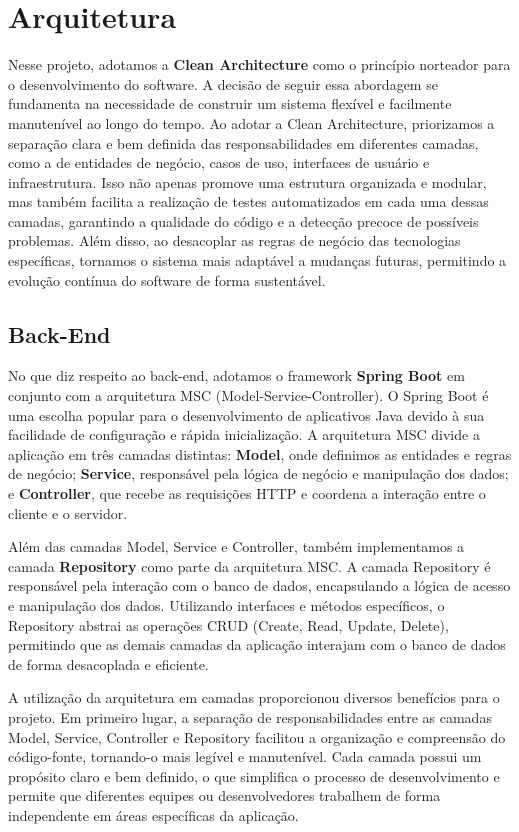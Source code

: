 \section{Arquitetura}

Nesse projeto, adotamos a \textbf{Clean Architecture} como o princípio norteador para o desenvolvimento do software. A decisão de seguir essa abordagem se fundamenta na necessidade de construir um sistema flexível e facilmente manutenível ao longo do tempo. Ao adotar a Clean Architecture, priorizamos a separação clara e bem definida das responsabilidades em diferentes camadas, como a de entidades de negócio, casos de uso, interfaces de usuário e infraestrutura. Isso não apenas promove uma estrutura organizada e modular, mas também facilita a realização de testes automatizados em cada uma dessas camadas, garantindo a qualidade do código e a detecção precoce de possíveis problemas. Além disso, ao desacoplar as regras de negócio das tecnologias específicas, tornamos o sistema mais adaptável a mudanças futuras, permitindo a evolução contínua do software de forma sustentável. 
\subsection{Back-End}
No que diz respeito ao back-end, adotamos o framework \textbf{Spring Boot} em conjunto com a arquitetura MSC (Model-Service-Controller). O Spring Boot é uma escolha popular para o desenvolvimento de aplicativos Java devido à sua facilidade de configuração e rápida inicialização. A arquitetura MSC divide a aplicação em três camadas distintas: \textbf{Model}, onde definimos as entidades e regras de negócio; \textbf{Service}, responsável pela lógica de negócio e manipulação dos dados; e \textbf{Controller}, que recebe as requisições HTTP e coordena a interação entre o cliente e o servidor. 

Além das camadas Model, Service e Controller, também implementamos a camada \textbf{Repository} como parte da arquitetura MSC. A camada Repository é responsável pela interação com o banco de dados, encapsulando a lógica de acesso e manipulação dos dados. Utilizando interfaces e métodos específicos, o Repository abstrai as operações CRUD (Create, Read, Update, Delete), permitindo que as demais camadas da aplicação interajam com o banco de dados de forma desacoplada e eficiente.

A utilização da arquitetura em camadas proporcionou diversos benefícios para o projeto. Em primeiro lugar, a separação de responsabilidades entre as camadas Model, Service, Controller e Repository facilitou a organização e compreensão do código-fonte, tornando-o mais legível e manutenível. Cada camada possui um propósito claro e bem definido, o que simplifica o processo de desenvolvimento e permite que diferentes equipes ou desenvolvedores trabalhem de forma independente em áreas específicas da aplicação.

